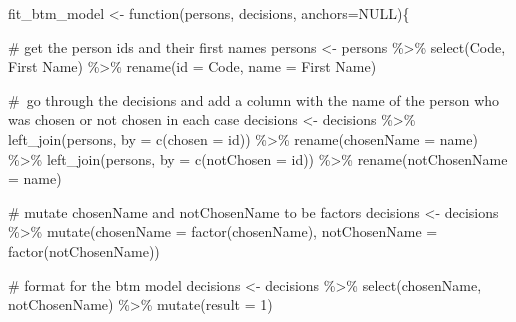 \documentclass[
  letterpaper,
  DIV=11,
  numbers=noendperiod]{scrreprt}
\newenvironment{Shaded}{\begin{snugshade}}{\end{snugshade}}
\newcommand{\AttributeTok}[1]{\textcolor[rgb]{0.40,0.45,0.13}{#1}}
\newcommand{\CommentTok}[1]{\textcolor[rgb]{0.37,0.37,0.37}{#1}}
\newcommand{\ConstantTok}[1]{\textcolor[rgb]{0.56,0.35,0.01}{#1}}
\newcommand{\ControlFlowTok}[1]{\textcolor[rgb]{0.00,0.23,0.31}{#1}}
\newcommand{\DecValTok}[1]{\textcolor[rgb]{0.68,0.00,0.00}{#1}}
\newcommand{\FunctionTok}[1]{\textcolor[rgb]{0.28,0.35,0.67}{#1}}
\newcommand{\NormalTok}[1]{\textcolor[rgb]{0.00,0.23,0.31}{#1}}
\newcommand{\OtherTok}[1]{\textcolor[rgb]{0.00,0.23,0.31}{#1}}
\newcommand{\SpecialCharTok}[1]{\textcolor[rgb]{0.37,0.37,0.37}{#1}}
\newcommand{\StringTok}[1]{\textcolor[rgb]{0.13,0.47,0.30}{#1}}
\begin{document}
\begin{Shaded}
\begin{Highlighting}[]
\NormalTok{fit\_btm\_model }\OtherTok{\textless{}{-}} \ControlFlowTok{function}\NormalTok{(persons, decisions, }\AttributeTok{anchors=}\ConstantTok{NULL}\NormalTok{)\{}

    \CommentTok{\# get the person ids and their first names}
\NormalTok{    persons }\OtherTok{\textless{}{-}}\NormalTok{ persons }\SpecialCharTok{\%\textgreater{}\%} 
    \FunctionTok{select}\NormalTok{(Code, }\StringTok{\textasciigrave{}}\AttributeTok{First Name}\StringTok{\textasciigrave{}}\NormalTok{) }\SpecialCharTok{\%\textgreater{}\%} 
    \FunctionTok{rename}\NormalTok{(}\AttributeTok{id =}\NormalTok{ Code, }\AttributeTok{name =} \StringTok{\textasciigrave{}}\AttributeTok{First Name}\StringTok{\textasciigrave{}}\NormalTok{)}

    \CommentTok{\# go through the decisions and add a column with the name of the person who was chosen or not chosen in each case}
\NormalTok{    decisions }\OtherTok{\textless{}{-}}\NormalTok{ decisions }\SpecialCharTok{\%\textgreater{}\%} \FunctionTok{left\_join}\NormalTok{(persons, }\AttributeTok{by =} \FunctionTok{c}\NormalTok{(}\StringTok{\textquotesingle{}chosen\textquotesingle{}} \OtherTok{=} \StringTok{\textquotesingle{}id\textquotesingle{}}\NormalTok{)) }\SpecialCharTok{\%\textgreater{}\%} 
    \FunctionTok{rename}\NormalTok{(}\AttributeTok{chosenName =}\NormalTok{ name) }\SpecialCharTok{\%\textgreater{}\%} 
    \FunctionTok{left\_join}\NormalTok{(persons, }\AttributeTok{by =} \FunctionTok{c}\NormalTok{(}\StringTok{\textquotesingle{}notChosen\textquotesingle{}} \OtherTok{=} \StringTok{\textquotesingle{}id\textquotesingle{}}\NormalTok{)) }\SpecialCharTok{\%\textgreater{}\%} 
    \FunctionTok{rename}\NormalTok{(}\AttributeTok{notChosenName =}\NormalTok{ name)}

    \CommentTok{\# mutate chosenName and notChosenName to be factors}
\NormalTok{    decisions }\OtherTok{\textless{}{-}}\NormalTok{ decisions }\SpecialCharTok{\%\textgreater{}\%} 
    \FunctionTok{mutate}\NormalTok{(}\AttributeTok{chosenName =} \FunctionTok{factor}\NormalTok{(chosenName), }\AttributeTok{notChosenName =} \FunctionTok{factor}\NormalTok{(notChosenName))}

    \CommentTok{\# format for the btm model}
\NormalTok{    decisions }\OtherTok{\textless{}{-}}\NormalTok{ decisions }\SpecialCharTok{\%\textgreater{}\%} 
    \FunctionTok{select}\NormalTok{(chosenName, notChosenName) }\SpecialCharTok{\%\textgreater{}\%} 
    \FunctionTok{mutate}\NormalTok{(}\AttributeTok{result =} \DecValTok{1}\NormalTok{)}


\end{Highlighting}
\end{Shaded}
\end{document}
